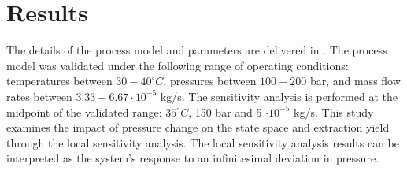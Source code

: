 \documentclass[../Article_Sensitivity_Analsysis.tex]{subfiles}
\begin{document}
	\section{Results} \label{CH: Results}
	The details of the process model and parameters are delivered in \citet{Sliczniuk2024}. The process model was validated under the following range of operating conditions: temperatures between $30 - 40^\circ C$, pressures between $100 - 200$ bar, and mass flow rates between $3.33-6.67 \cdot 10^{-5}$ kg/s. The sensitivity analysis is performed at the midpoint of the validated range: $35^\circ C$, 150 bar and 5 $\cdot 10^{-5}$ kg/s. This study examines the impact of pressure change on the state space and extraction yield through the local sensitivity analysis. The local sensitivity analysis results can be interpreted as the system's response to an infinitesimal deviation in pressure.
	
        
    
    
	
\end{document}
